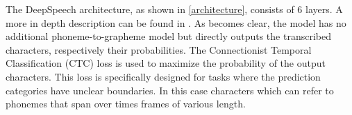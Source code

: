 The DeepSpeech architecture, as shown in \ref{architecture}, consists of 6 layers. A more in depth description can be found in \citet{Agarwal2019GermanES}. As becomes clear, the model has no additional phoneme-to-grapheme model but directly outputs the transcribed characters, respectively their probabilities. The Connectionist Temporal Classification (CTC) loss is used to maximize the probability of the output characters. This loss is specifically designed for tasks where the prediction categories have unclear boundaries. In this case characters which can refer to phonemes that span over times frames of various length.  